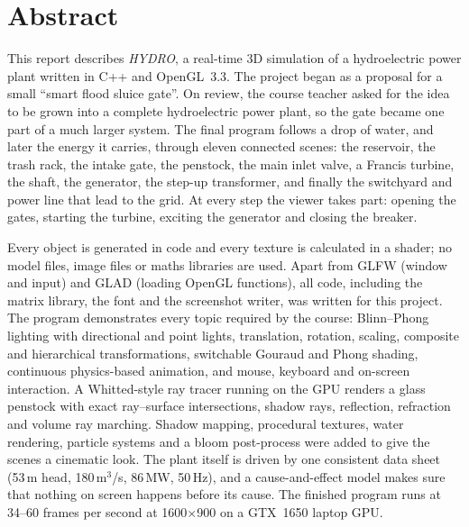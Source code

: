 \documentclass[11pt,a4paper]{report}
\begin{document}
\chapter*{Abstract}

This report describes \emph{HYDRO}, a real-time 3D simulation of a hydroelectric
power plant written in C++ and OpenGL~3.3. The project began as a proposal for a
small ``smart flood sluice gate''. On review, the course teacher asked for the idea
to be grown into a complete hydroelectric power plant, so the gate became one part of
a much larger system. The final program follows a drop of water, and later the
energy it carries, through eleven connected scenes: the reservoir, the trash rack,
the intake gate, the penstock, the main inlet valve, a Francis turbine, the shaft, the
generator, the step-up transformer, and finally the switchyard and power line that
lead to the grid. At every step the viewer takes part: opening the gates, starting
the turbine, exciting the generator and closing the breaker.

Every object is generated in code and every texture is calculated in a shader; no
model files, image files or maths libraries are used. Apart from GLFW (window and
input) and GLAD (loading OpenGL functions), all code, including the matrix library,
the font and the screenshot writer, was written for this project. The program
demonstrates every topic required by the course: Blinn--Phong lighting with
directional and point lights, translation, rotation, scaling, composite and
hierarchical transformations, switchable Gouraud and Phong shading, continuous
physics-based animation, and mouse, keyboard and on-screen interaction. A Whitted-style
ray tracer running on the GPU renders a glass penstock with exact ray--surface
intersections, shadow rays, reflection, refraction and volume ray marching. Shadow
mapping, procedural textures, water rendering, particle systems and a bloom
post-process were added to give the scenes a cinematic look. The plant itself is
driven by one consistent data sheet (53\,m head, 180\,m$^3$/s, 86\,MW, 50\,Hz), and
a cause-and-effect model makes sure that nothing on screen happens before its cause.
The finished program runs at 34--60 frames per second at 1600$\times$900 on a
GTX~1650 laptop GPU.

\begingroup
\hypersetup{linkcolor=black}
\setcounter{tocdepth}{1}
\makeatletter
\renewcommand*\l@chapter[2]{%
  \ifnum \c@tocdepth >\m@ne
    \addpenalty{-\@highpenalty}%
    \vskip 0.5em \@plus\p@
    \setlength\@tempdima{1.5em}%
    \begingroup
      \parindent \z@ \rightskip \@pnumwidth
      \parfillskip -\@pnumwidth
      \leavevmode \bfseries
      \advance\leftskip\@tempdima
      \hskip -\leftskip
      #1\nobreak\hfil
      \nobreak\hb@xt@\@pnumwidth{\hss #2\kern-\p@\kern\p@}\par
      \penalty\@highpenalty
    \endgroup
  \fi}
\makeatother
\tableofcontents
\endgroup
\end{document}
